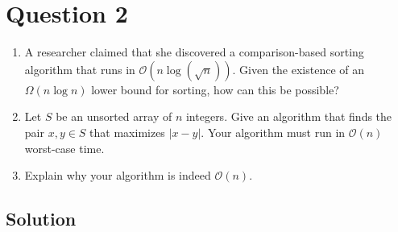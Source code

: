 
\section*{Question 2}

\begin{enumerate}[label=(\alph*)]
\item A researcher claimed that she discovered a comparison-based sorting algorithm that runs in $\mathcal{O}(n\log (\sqrt{n}))$.
Given the existence of an $\Omega(n\log n)$ lower bound for sorting, how can this be possible?

\item Let $S$ be an unsorted array of $n$ integers.
Give an algorithm that finds the pair $x,y \in S$ that maximizes $|x - y|$.
Your algorithm must run in $\mathcal{O}(n)$ worst-case time.

\item Explain why your algorithm is indeed $\mathcal{O}(n)$.
\end{enumerate}

\subsection*{Solution}

